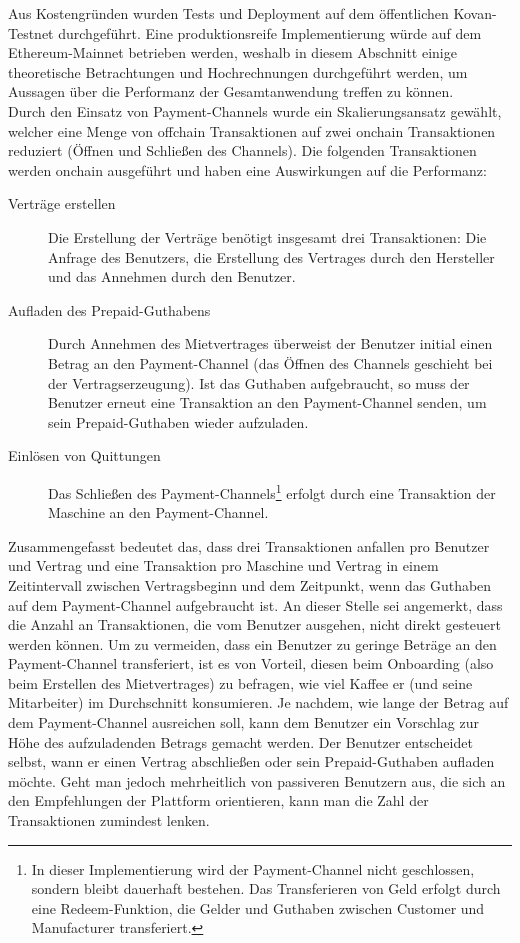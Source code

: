Aus Kostengründen wurden Tests und Deployment auf dem öffentlichen Kovan-Testnet durchgeführt. Eine produktionsreife Implementierung würde auf dem Ethereum-Mainnet betrieben werden, weshalb in diesem Abschnitt einige theoretische Betrachtungen und Hochrechnungen durchgeführt werden, um Aussagen über die Performanz der Gesamtanwendung treffen zu können.\\
Durch den Einsatz von Payment-Channels wurde ein Skalierungsansatz gewählt, welcher eine Menge von offchain Transaktionen auf zwei onchain Transaktionen reduziert (Öffnen und Schließen des Channels). Die folgenden Transaktionen werden onchain ausgeführt und haben eine Auswirkungen auf die Performanz:
\begin{description}
  \item[Verträge erstellen] Die Erstellung der Verträge benötigt insgesamt drei Transaktionen: Die Anfrage des Benutzers, die Erstellung des Vertrages durch den Hersteller und das Annehmen durch den Benutzer.
  \item[Aufladen des Prepaid-Guthabens] Durch Annehmen des Mietvertrages überweist der Benutzer initial einen Betrag an den Payment-Channel (das Öffnen des Channels geschieht bei der Vertragserzeugung). Ist das Guthaben aufgebraucht, so muss der Benutzer erneut eine Transaktion an den Payment-Channel senden, um sein Prepaid-Guthaben wieder aufzuladen.
  \item[Einlösen von Quittungen] Das Schließen des Payment-Channels\footnote{In dieser Implementierung wird der Payment-Channel nicht geschlossen, sondern bleibt dauerhaft bestehen. Das Transferieren von Geld erfolgt durch eine Redeem-Funktion, die Gelder und Guthaben zwischen Customer und Manufacturer transferiert.} erfolgt durch eine Transaktion der Maschine an den Payment-Channel.\\
\end{description}
Zusammengefasst bedeutet das, dass drei Transaktionen anfallen pro Benutzer und Vertrag und eine Transaktion pro Maschine und Vertrag in einem Zeitintervall zwischen Vertragsbeginn und dem Zeitpunkt, wenn das Guthaben auf dem Payment-Channel aufgebraucht ist. An dieser Stelle sei angemerkt, dass die Anzahl an Transaktionen, die vom Benutzer ausgehen, nicht direkt gesteuert werden können. Um zu vermeiden, dass ein Benutzer zu geringe Beträge an den Payment-Channel transferiert, ist es von Vorteil, diesen beim Onboarding (also beim Erstellen des Mietvertrages) zu befragen, wie viel Kaffee er (und seine Mitarbeiter) im Durchschnitt konsumieren. Je nachdem, wie lange der Betrag auf dem Payment-Channel ausreichen soll, kann dem Benutzer ein Vorschlag zur Höhe des aufzuladenden Betrags gemacht werden. Der Benutzer entscheidet selbst, wann er einen Vertrag abschließen oder sein Prepaid-Guthaben aufladen möchte. Geht man jedoch mehrheitlich von passiveren Benutzern aus, die sich an den Empfehlungen der Plattform orientieren, kann man die Zahl der Transaktionen zumindest lenken.\\
